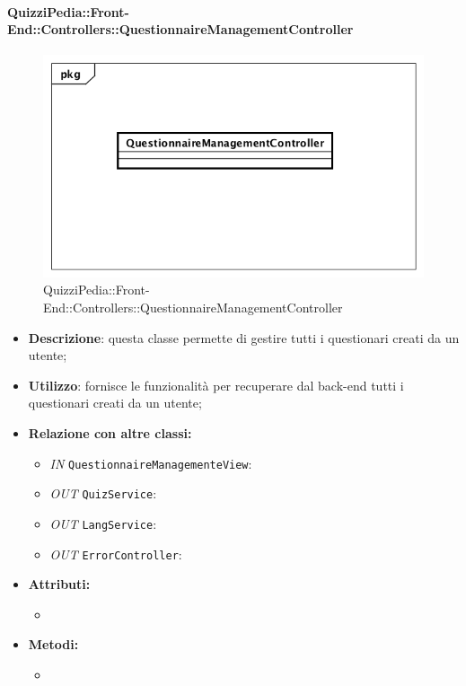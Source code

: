 \paragraph{QuizziPedia::Front-End::Controllers::QuestionnaireManagementController}
\begin{figure}
	\centering
	\includegraphics[scale=0.45]{UML/Classi/Front-End/QuizziPedia_Front-end_Controller_QuestionnaireManagementController.png}
	\caption{QuizziPedia::Front-End::Controllers::QuestionnaireManagementController}
\end{figure}
\begin{itemize}
	\item \textbf{Descrizione}: questa classe permette di gestire tutti i questionari creati da un utente; 
	\item \textbf{Utilizzo}: fornisce le funzionalità per recuperare dal back-end tutti i questionari creati da un utente;
	\item \textbf{Relazione con altre classi:}
	\begin{itemize}
		\item \textit{IN} \texttt{QuestionnaireManagementeView}: 
		\item \textit{OUT} \texttt{QuizService}:
		\item \textit{OUT} \texttt{LangService}:
		\item \textit{OUT} \texttt{ErrorController}: 
	\end{itemize}
	\item \textbf{Attributi:}
	\begin{itemize}
		\item 
	\end{itemize}
	\item \textbf{Metodi:}
	\begin{itemize}
		\item 
	\end{itemize}
\end{itemize}

